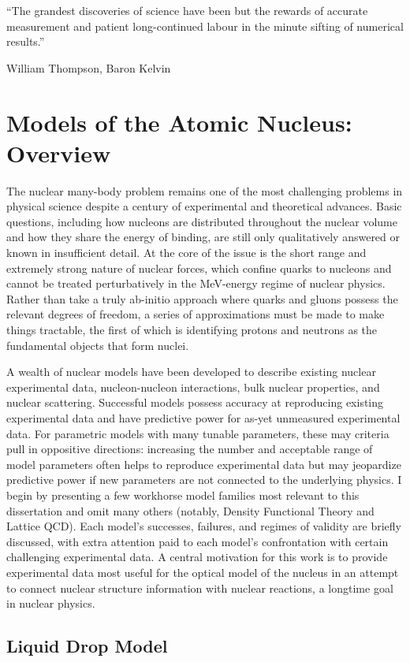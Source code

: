 \epigraph{``The grandest discoveries of science have been but the rewards of
    accurate measurement and patient long-continued labour in the minute
sifting of numerical results.''}{William Thompson,  Baron Kelvin}

\section{Models of the Atomic Nucleus: Overview}
The nuclear many-body problem remains one of the most challenging problems in
physical science despite a century of experimental and theoretical advances.
Basic questions, including how nucleons are distributed throughout the nuclear
volume and how they share the energy of binding, are still only qualitatively
answered or known in insufficient detail. At the core of the issue is the short
range and extremely strong nature of nuclear forces, which confine
quarks to nucleons and cannot be treated perturbatively in the MeV-energy regime of
nuclear physics. Rather than take a truly ab-initio approach where quarks and gluons
possess the relevant degrees of freedom, a series of approximations must be made
to make things tractable, the first of which is identifying protons and neutrons as
the fundamental objects that form nuclei.

A wealth of nuclear models have been developed to describe existing nuclear
experimental data, nucleon-nucleon interactions, bulk nuclear properties, and
nuclear scattering. Successful models possess accuracy at reproducing existing experimental data
and have predictive power for as-yet unmeasured experimental data. For parametric models
with many tunable parameters, these may criteria pull in oppositive directions:
increasing the number
and acceptable range of model parameters often helps to reproduce experimental data but may
jeopardize predictive power if new parameters are not connected to the underlying physics.
I begin by presenting a few workhorse model families most relevant
to this dissertation and omit many others (notably, Density Functional Theory
and Lattice QCD). Each model's successes,
failures, and regimes of validity are briefly discussed, with extra attention paid
to each model's confrontation with certain challenging experimental data.
A central motivation for this work is to provide experimental data most useful for
the optical model of the nucleus in an attempt to
connect nuclear structure information with nuclear reactions, a longtime goal
in nuclear physics. 

\subsection{Liquid Drop Model}

